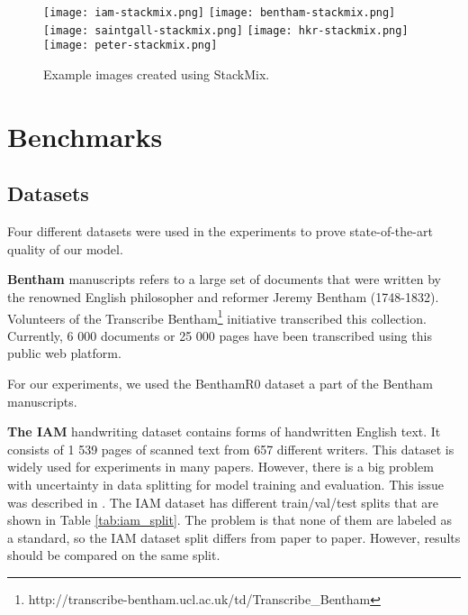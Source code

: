 \documentclass[10pt,twocolumn,letterpaper]{article}
\begin{document}
\begin{figure}
\begin{center}
\texttt{[image: iam-stackmix.png]}
    \label{fig:example1_c}
    \texttt{[image: bentham-stackmix.png]}
    \label{fig:example2_c}
    \texttt{[image: saintgall-stackmix.png]}
    \label{fig:example3_c}
    \texttt{[image: hkr-stackmix.png]}
    \label{fig:example4_c}
    \texttt{[image: peter-stackmix.png]}
    \label{fig:example5_c}
\end{center}
   \caption{Example images created using StackMix.}
\label{fig:stackmix-examples}
\end{figure}

\section{Benchmarks}

\subsection{Datasets}
Four different datasets were used in the experiments to prove state-of-the-art quality of our model.

\medskip
\noindent 
\textbf{Bentham} manuscripts refers to a large set of documents that were written by the renowned English philosopher and reformer Jeremy Bentham (1748-1832). Volunteers of the Transcribe Bentham\footnote{http://transcribe-bentham.ucl.ac.uk/td/Transcribe\_Bentham} initiative transcribed this collection. 
Currently,  6 000 documents or  25 000 pages have been transcribed using this public web platform.

For our experiments, we used the BenthamR0 dataset \cite{bentham} a part of the Bentham manuscripts.

\medskip
\noindent 
\textbf{The IAM} handwriting dataset contains forms of handwritten English text. It consists of 1 539 pages of scanned text from 657 different writers. This dataset is widely used for experiments in many papers. However, there is a big problem with uncertainty in data splitting for model training and evaluation. This issue was described in \cite{michael2019evaluating}. The IAM dataset has different train/val/test splits that are shown in Table \ref{tab:iam_split}. The problem is that none of them are labeled as a standard, so the IAM dataset split differs from paper to paper. However, results should be compared on the same split. 
\end{document}
